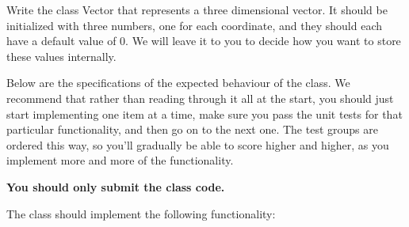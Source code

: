 
Write the class Vector that represents a three dimensional vector.
It should be initialized with three numbers, one for each coordinate,
and they should each have a default value of $0$.
We will leave it to you to decide
how you want to store these values internally.

Below are the specifications of the expected behaviour of the class.
We recommend that rather than reading through it all at the start,
you should just start implementing one item at a time,
make sure you pass the unit tests for that particular functionality,
and then go on to the next one.
The test groups are ordered this way,
so you'll gradually be able to score higher and higher,
as you implement more and more of the functionality.

\textbf{You should only submit the class code.}

The class should implement the following functionality:

